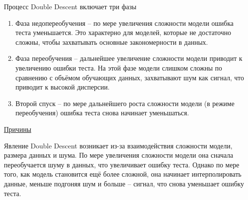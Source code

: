 Процесс Double Descent включает три фазы
\begin{enumerate}
    \item Фаза недопереобучения -- по мере увеличения сложности модели ошибка теста уменьшается.
    Это характерно для моделей, которые не достаточно сложны, чтобы захватывать основные закономерности в данных.
    \item Фаза переобучения -- дальнейшее увеличение сложности модели приводит к увеличению ошибки теста.
    На этой фазе модели слишком сложны по сравнению с объёмом обучающих данных, захватывают шум как сигнал, что
    приводит к высокой дисперсии.
    \item Второй спуск -- по мере дальнейшего роста сложности модели (в режиме переобучения) ошибка теста снова
    начинает уменьшаться.
\end{enumerate}

\underline{Причины}

Явление Double Descent возникает из-за взаимодействия сложности модели, размера данных и шума.
По мере увеличения сложности модели она сначала переобучается шуму в данных, что увеличивает ошибку теста.
Однако по мере того, как модель становится ещё более сложной, она начинает интерполировать данные, меньше подгоняя
шум и больше -- сигнал, что снова уменьшает ошибку теста.